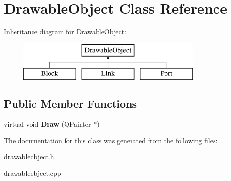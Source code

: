\hypertarget{classDrawableObject}{}\section{Drawable\+Object Class Reference}
\label{classDrawableObject}
Inheritance diagram for Drawable\+Object\+:\begin{figure}[H]
\begin{center}
\leavevmode
\includegraphics[height=2.000000cm]{classDrawableObject}
\end{center}
\end{figure}
\subsection*{Public Member Functions}
\begin{DoxyCompactItemize}
\item 
\mbox{\label{classDrawableObject_a107d5c6f1ec88d09582610c2612630c9}} 
virtual void {\bfseries Draw} (Q\+Painter $\ast$)
\end{DoxyCompactItemize}


The documentation for this class was generated from the following files\+:\begin{DoxyCompactItemize}
\item 
drawableobject.\+h\item 
drawableobject.\+cpp\end{DoxyCompactItemize}

